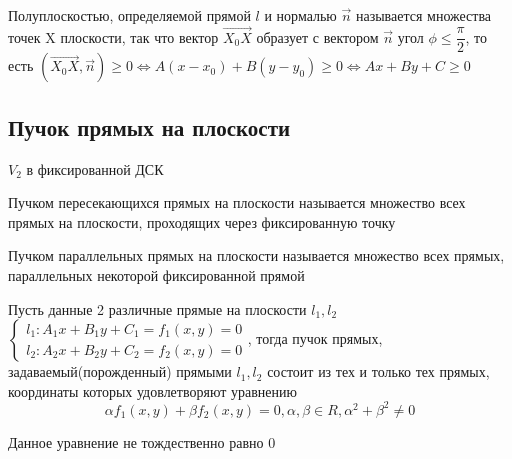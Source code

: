 \begin{definition}
	Полуплоскостью, определяемой прямой \(l\) и нормалью \(\vec n\) называется множества точек X плоскости, так что вектор \(\vec{X_0X}\) образует с вектором $\vec{n}$ угол \(\phi\le \dfrac{\pi}{2}\), то есть \((\vec{X_0X}, \vec n)\ge0\Longleftrightarrow A(x-x_0)+B(y-y_0)\ge 0 \Longleftrightarrow Ax+By+C\ge 0\) 
\end{definition}
\subsection{Пучок прямых на плоскости}
\(V_2\) в фиксированной ДСК
\begin{definition}
	Пучком пересекающихся прямых на плоскости называется множество всех прямых на плоскости, проходящих через фиксированную точку
\end{definition}
\begin{definition}
	Пучком параллельных прямых на плоскости называется множество всех прямых, параллельных некоторой фиксированной прямой
\end{definition}
\begin{theorem}
	Пусть данные 2 различные прямые на плоскости \(l_1, l_2\) \(\left\{\begin{gathered}
		l_1: A_1x+B_1y+C_1 = f_1(x,y) = 0 \\
		l_2: A_2x+B_2y+C_2 = f_2(x,y) = 0
	\end{gathered}\right.\), тогда пучок прямых, задаваемый(порожденный) прямыми \(l_1, l_2\) состоит из тех и только тех прямых, координаты которых удовлетворяют уравнению \[\alpha f_1(x,y)+\beta f_2(x,y) = 0, \alpha, \beta\in R, \alpha^2+\beta^2\ne0\]
\end{theorem}
\begin{note}
	Данное уравнение не тождественно равно 0
\end{note}
